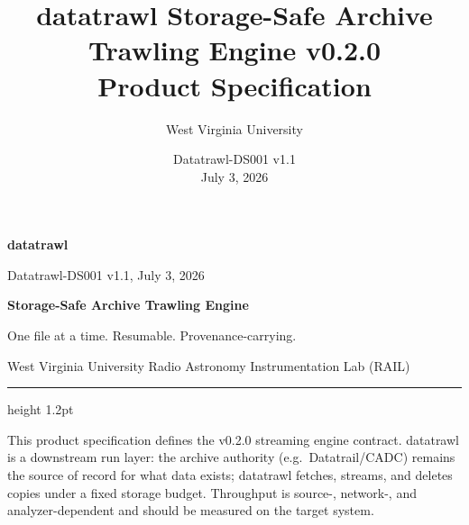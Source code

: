 \documentclass[10pt,letterpaper]{article}
\title{datatrawl Storage-Safe Archive Trawling Engine v0.2.0\\Product Specification}
\author{West Virginia University}
\date{Datatrawl-DS001 v1.1 \\ July 3, 2026}
\begin{document}
\thispagestyle{fancy}
{\sffamily
\begin{minipage}[t]{0.39\textwidth}
  {\fontsize{24}{26}\selectfont\bfseries\color{TrawlAmber}datatrawl}\par
  {\small Datatrawl-DS001 v1.1, July 3, 2026}
\end{minipage}%
\begin{minipage}[t]{0.61\textwidth}
  \raggedleft
  {\large\bfseries Storage-Safe Archive Trawling Engine}\par
  {\small One file at a time. Resumable. Provenance-carrying.}\par
  {\small West Virginia University Radio Astronomy Instrumentation Lab (RAIL)}
\end{minipage}
}
\vspace{6pt}
{\color{TrawlAmber}\hrule height 1.2pt}
\vspace{8pt}

{\small\color{TrawlGray}This product specification defines the v0.2.0 streaming
engine contract. datatrawl is a downstream run layer: the archive authority
(e.g.\ Datatrail/CADC) remains the source of record for what data exists;
datatrawl fetches, streams, and deletes copies under a fixed storage budget.
Throughput is source-, network-, and analyzer-dependent and should be measured
on the target system.}
\end{document}
